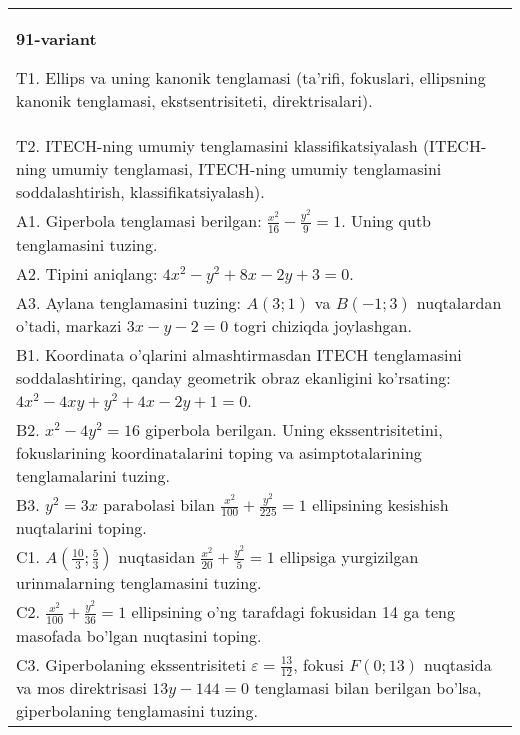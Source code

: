 \documentclass{article}
\begin{document}
\begin{tabular}{m{17cm}}
\textbf{91-variant}
\newline

T1. Ellips va uning kanonik tenglamasi (ta'rifi, fokuslari, ellipsning kanonik tenglamasi, ekstsentrisiteti, direktrisalari).\\

T2. ITECH-ning umumiy tenglamasini klassifikatsiyalash (ITECH-ning umumiy tenglamasi, ITECH-ning umumiy tenglamasini soddalashtirish, klassifikatsiyalash).\\

A1. Giperbola tenglamasi berilgan: $\frac{x^{2}}{16}-\frac{y^{2}}{9}=1$. Uning qutb tenglamasini tuzing.\\

A2. Tipini aniqlang: $4x^{2}-y^{2}+8x-2y+3=0$.\\

A3. Aylana tenglamasini tuzing: $A(3;1)$ va $B(-1;3)$ nuqtalardan o'tadi, markazi $3x-y-2=0$ togri chiziqda joylashgan.\\

B1. Koordinata o'qlarini almashtirmasdan ITECH tenglamasini soddalashtiring, qanday geometrik obraz ekanligini ko'rsating: $4x^{2} - 4xy + y^{2} + 4x - 2y + 1 = 0$.  \\

B2. $x^{2} - 4y^{2} = 16$ giperbola berilgan. Uning ekssentrisitetini, fokuslarining koordinatalarini toping va asimptotalarining tenglamalarini tuzing.\\

B3. $y^{2} = 3x$ parabolasi bilan $\frac{x^{2}}{100} + \frac{y^{2}}{225} = 1$ ellipsining kesishish nuqtalarini toping.  \\

C1. $A(\frac{10}{3};\frac{5}{3})$ nuqtasidan $\frac{x^{2}}{20} + \frac{y^{2}}{5} = 1$ ellipsiga yurgizilgan urinmalarning tenglamasini tuzing.  \\

C2. $\frac{x^{2}}{100} + \frac{y^{2}}{36} = 1$ ellipsining o'ng tarafdagi fokusidan 14 ga teng masofada bo'lgan nuqtasini toping.  \\

C3. Giperbolaning ekssentrisiteti $\varepsilon = \frac{13}{12}$, fokusi $F(0;13)$ nuqtasida va mos direktrisasi $13y - 144 = 0$ tenglamasi bilan berilgan bo'lsa, giperbolaning tenglamasini tuzing.  \\

\end{tabular}
\vspace{1cm}
\end{document}
